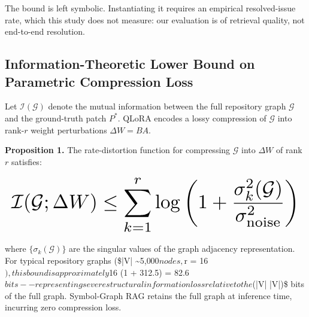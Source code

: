 \documentclass[10pt,twocolumn,letterpaper]{article}
\begin{document}
The bound is left symbolic. Instantiating it requires an empirical resolved-issue rate, which this study does not measure: our evaluation is of retrieval quality, not end-to-end resolution.


\subsection{Information-Theoretic Lower Bound on Parametric Compression Loss}


Let $\mathcal{I}(\mathcal{G})$ denote the mutual information between the full repository graph $\mathcal{G}$ and the ground-truth patch $P^*$. QLoRA encodes a lossy compression of $\mathcal{G}$ into rank-$r$ weight perturbations $\Delta W = BA$.

\textbf{Proposition 1.} The rate-distortion function for compressing $\mathcal{G}$ into $\Delta W$ of rank $r$ satisfies:





















\begin{equation}
\resizebox{\columnwidth}{!}{$\displaystyle
\begin{aligned}
\mathcal{I}(\mathcal{G}; \Delta W) \leq \sum_{k=1}^{r} \log\left(1 + \frac{\sigma_k^2(\mathcal{G})}{\sigma_{\text{noise}}^2}\right)
\end{aligned}
$}
\end{equation}





















where $\{\sigma_k(\mathcal{G})\}$ are the singular values of the graph adjacency representation. For typical repository graphs (\$|V| \sim 5{,}000$ nodes, $r = 16$), this bound is approximately $16 \times \log(1 + 312.5) = 82.6$ bits -- representing severe structural information loss relative to the $(|V| \log |V|)\$ bits of the full graph. Symbol-Graph RAG retains the full graph at inference time, incurring zero compression loss.
\end{document}
